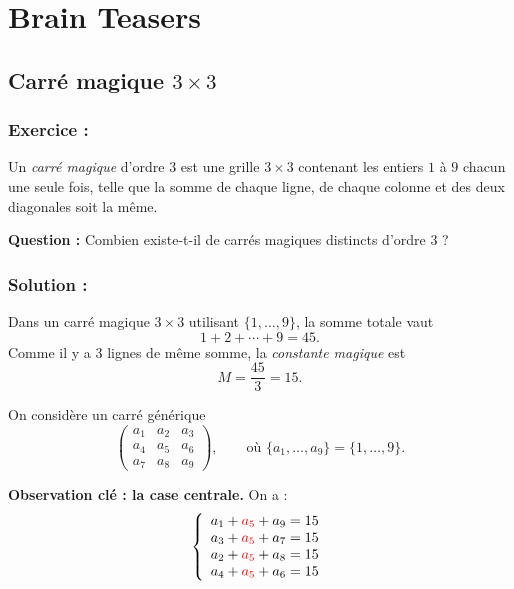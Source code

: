 \chapter{Brain Teasers}

\section{Carré magique $3\times 3$}

\subsection*{Exercice :}

\begin{exerciseBox}
Un \emph{carré magique} d'ordre $3$ est une grille $3\times 3$ contenant les entiers $1$ à $9$ chacun une seule fois, telle que la somme de chaque ligne, de chaque colonne et des deux diagonales soit la même.
\medskip

\textbf{Question :}  Combien existe-t-il de carrés magiques distincts d’ordre $3$ ?

\end{exerciseBox}

\subsection*{Solution :}



Dans un carré magique $3\times 3$ utilisant $\{1,\dots,9\}$, la somme totale vaut
\[
1+2+\cdots+9=45.
\]
Comme il y a $3$ lignes de même somme, la \emph{constante magique} est
\[
M=\frac{45}{3}=15.
\]

On considère un carré générique
\[
\begin{pmatrix}
a_1 & a_2 & a_3 \\
a_4 & a_5 & a_6 \\
a_7 & a_8 & a_9
\end{pmatrix},
\qquad
\text{où } \{a_1,\dots,a_9\}=\{1,\dots,9\}.
\]

\medskip
\noindent\textbf{Observation clé : la case centrale.} 
On a : 
\[
\left\{
\begin{array}{l}
a_1 + \textcolor{red}{a_5} + a_9 = 15 \\
a_3 + \textcolor{red}{a_5} + a_7 = 15 \\
a_2 + \textcolor{red}{a_5} + a_8 = 15 \\
a_4 + \textcolor{red}{a_5} + a_6 = 15
\end{array}
\right.
\]
  


